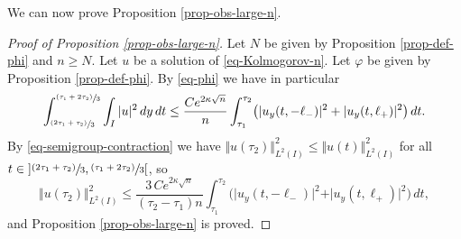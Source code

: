 \documentclass[10pt]{amsart}
\newcommand{\psfrac}[2]{\sfrac{(#1)}{#2}}
\theoremstyle{plain}
\theoremstyle{definition}
\newcommand{\abs}[1]{\vert #1\vert}
\newcommand{\nr}[1]{\Vert #1\Vert}
\newcommand{\1}{\mathds 1}
\let\k\kappa
\let\f\varphi
\begin{document}
We can now prove Proposition \ref{prop-obs-large-n}.

\begin{proof}[Proof of Proposition \ref{prop-obs-large-n}]
Let $N$ be given by Proposition \ref{prop-def-phi} and $n \geq N$. Let $u$ be a solution of \eqref{eq-Kolmogorov-n}. Let $\f$ be given by Proposition \ref{prop-def-phi}. By \eqref{eq-phi} we have in particular
\[
\int_{\psfrac{2 \tau_1 + \tau_2}{3}}^{\psfrac{\tau_1 + 2\tau_2}{3}} \int_{I} \abs{u}^2 \, dy \, dt \leq \frac {C e^{2 \k \sqrt n}} n \int_{\tau_1}^{\tau_2} \bigl(\abs{u_y (t,-\ell_-)}^2 + \abs{u_y(t,\ell_+)}^2 \bigr) \, dt.
\]
By \eqref{eq-semigroup-contraction} we have $\nr{u(\tau_2)}_{L^2(I)}^2 \leq \nr{u(t)}_{L^2(I)}^2$ for all $t \in{}] \psfrac{2\tau_1 + \tau_2}{3}, \psfrac{\tau_1 + 2\tau_2}{3}[$, so
\[
\nr{u(\tau_2)}_{L^2(I)}^2 \leq \frac{3\,C e^{2 \k \sqrt n}}{(\tau_2-\tau_1)n} \int_{\tau_1}^{\tau_2} \bigl(\abs{u_y (t,-\ell_-)}^2 + \abs{u_y(t,\ell_+)}^2 \bigr) \, dt,
\]
and Proposition \ref{prop-obs-large-n} is proved.
\end{proof}
\end{document}
